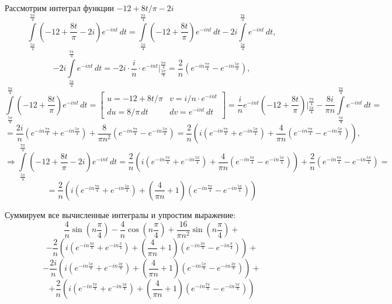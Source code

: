 \documentclass[a4paper, 16pt]{article}
\begin{document}
\noindent Рассмотрим интеграл функции $-12+8t/\pi-2i$
$$
\int\limits_{\frac{5\pi}{4}}^{\frac{7\pi}{4}}\left(-12+\dfrac{8t}{\pi}-2i\right)e^{-int}\,dt=
\int\limits_{\frac{5\pi}{4}}^{\frac{7\pi}{4}}\left(-12+\dfrac{8t}{\pi}\right)e^{-int}\,dt-2i\int\limits_{\frac{5\pi}{4}}^{\frac{7\pi}{4}}e^{-int}\,dt,
$$
$$
-2i\int\limits_{\frac{5\pi}{4}}^{\frac{7\pi}{4}}e^{-int}\,dt=-2i\cdot\dfrac{i}{n}\cdot e^{-int}\bigg|_{\frac{5\pi}{4}}^{\frac{7\pi}{4}}=
\dfrac{2}{n}\left(e^{-in\frac{7\pi}{4}}-e^{-in\frac{5\pi}{4}}\right),
$$
$$
\int\limits_{\frac{5\pi}{4}}^{\frac{7\pi}{4}}\left(-12+\dfrac{8t}{\pi}\right)e^{-int}\,dt=
\begin{bmatrix}
    u=-12+8t/\pi & v=i/n\cdot e^{-int} \\
    du=8/\pi\,dt & dv=e^{-int}\,dt
\end{bmatrix}=
\dfrac{i}{n}e^{-int}\left(-12+\dfrac{8t}{\pi}\right)\bigg|_{\frac{5\pi}{4}}^{\frac{7\pi}{4}}-\dfrac{8i}{\pi n}\int\limits_{\frac{5\pi}{4}}^{\frac{7\pi}{4}}e^{-int}\,dt=
$$
$$
=\dfrac{2i}{n}\left(e^{-in\frac{7\pi}{4}}+e^{-in\frac{5\pi}{4}}\right)+\dfrac{8}{\pi n^2}\left(e^{-in\frac{7\pi}{4}}-e^{-in\frac{5\pi}{4}}\right)=
\dfrac{2}{n}\left(i\left(e^{-in\frac{7\pi}{4}}+e^{-in\frac{5\pi}{4}}\right)+\dfrac{4}{\pi n}\left(e^{-in\frac{7\pi}{4}}-e^{-in\frac{5\pi}{4}}\right)\right),
$$
$$
\Rightarrow\int\limits_{\frac{5\pi}{4}}^{\frac{7\pi}{4}}\left(-12+\dfrac{8t}{\pi}-2i\right)e^{-int}\,dt=
\dfrac{2}{n}\left(i\left(e^{-in\frac{7\pi}{4}}+e^{-in\frac{5\pi}{4}}\right)+\dfrac{4}{\pi n}\left(e^{-in\frac{7\pi}{4}}-e^{-in\frac{5\pi}{4}}\right)\right)+\dfrac{2}{n}\left(e^{-in\frac{7\pi}{4}}-e^{-in\frac{5\pi}{4}}\right)=
$$
$$
=\dfrac{2}{n}\left(i\left(e^{-in\frac{7\pi}{4}}+e^{-in\frac{5\pi}{4}}\right)+\left(\dfrac{4}{\pi n}+1\right)\left(e^{-in\frac{7\pi}{4}}-e^{-in\frac{5\pi}{4}}\right)\right)
$$


\noindent Суммируем все вычисленные интегралы и упростим выражение:
$$
\dfrac{4}{n}\sin{\left(n\dfrac{\pi}{4}\right)}-\dfrac{4}{n}\cos{\left(n\dfrac{\pi}{4}\right)}+\dfrac{16}{\pi n^2}\sin{\left(n\dfrac{\pi}{4}\right)}+
$$
$$
-\dfrac{2}{n}\left(i\left(e^{-in\frac{3\pi}{4}}+e^{-in\frac{\pi}{4}}\right)+\left(\dfrac{4}{\pi n}+1\right)\left(e^{-in\frac{3\pi}{4}}-e^{-in\frac{\pi}{4}}\right)\right)+
$$
$$
-\dfrac{2i}{n}\left(i\left(e^{-in\frac{5\pi}{4}}+e^{-in\frac{3\pi}{4}}\right)+\left(\dfrac{4}{\pi n}+1\right)\left(e^{-in\frac{5\pi}{4}}-e^{-in\frac{3\pi}{4}}\right)\right)+
$$
$$
+\dfrac{2}{n}\left(i\left(e^{-in\frac{7\pi}{4}}+e^{-in\frac{5\pi}{4}}\right)+\left(\dfrac{4}{\pi n}+1\right)\left(e^{-in\frac{7\pi}{4}}-e^{-in\frac{5\pi}{4}}\right)\right)
$$
\end{document}

